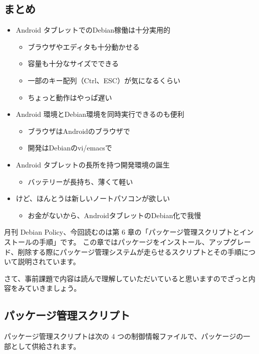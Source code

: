 \documentclass[mingoth,a4paper]{jsarticle}
\begin{document}
\subsection{まとめ}
\begin{itemize}
 \item Android タブレットでのDebian稼働は十分実用的
       \begin{itemize}
        \item ブラウザやエディタも十分動かせる
        \item 容量も十分なサイズでできる
        \item 一部のキー配列（Ctrl、ESC）が気になるくらい
        \item ちょっと動作はやっぱ遅い
       \end{itemize}
 \item Android 環境とDebian環境を同時実行できるのも便利
       \begin{itemize}
        \item ブラウザはAndroidのブラウザで
        \item 開発はDebianのvi/emacsで
       \end{itemize}
 \item Android タブレットの長所を持つ開発環境の誕生
       \begin{itemize}
        \item バッテリーが長持ち、薄くて軽い
       \end{itemize}
 \item けど、ほんとうは新しいノートパソコンが欲しい
       \begin{itemize}
        \item お金がないから、AndroidタブレットのDebian化で我慢
       \end{itemize}
\end{itemize}

\clearpage


月刊 Debian Policy、今回読むのは第 6 章の「パッケージ管理スクリプトとインストールの手順」です。
この章ではパッケージをインストール、アップグレード、削除する際にパッケージ管理システムが走らせるスクリプトとその手順について説明されています。

さて、事前課題で内容は読んで理解していただいていると思いますのでざっと内容をみていきましょう。

\subsection{パッケージ管理スクリプト}
パッケージ管理スクリプトは次の 4 つの制御情報ファイルで、パッケージの一部として供給されます。
\end{document}
